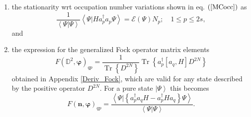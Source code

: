 \documentclass[aps,preprint]{revtex4}%
\begin{document}
\begin{enumerate}
\item the stationarity wrt occupation number variations shown in eq. $\left(
\ref{MCocc}\right)  $ as
\begin{equation}
\frac{1}{\left\langle \left.  \Psi\right\vert \Psi\right\rangle }\left\langle
\left.  \Psi\right\vert Ha_{p}^{\dagger}a_{p}\Psi\right\rangle =\mathcal{E}%
\left(  \Psi\right)  N_{p};\quad1\leq p\leq2s,
\end{equation}
and

\item the expression for the generalized Fock operator matrix elements
\cite{YellowBook}
\begin{equation}
F\left(  \mathbb{D}^{2},\bm{\varphi}\right)  _{qp}=\frac{1}{\operatorname{Tr}%
\left\{  D^{2N}\right\}  }\operatorname{Tr}\left\{  a_{p}^{\dagger}\left[
a_{q},H\right]  D^{2N}\right\}
\end{equation}
obtained in Appendix \ref{Deriv_Fock}, which are valid for any state described
by the positive operator $D^{2N}$. For a pure state $\left\vert \Psi
\right\rangle $ this becomes
\begin{equation}
F\left(  \bm{n},\bm{\varphi}\right)  _{qp}=\frac{\left\langle \left.
\Psi\right\vert \left\{  a_{p}^{\dagger}a_{q}H-a_{p}^{\dagger}Ha_{q}\right\}
\Psi\right\rangle }{\left\langle \left.  \Psi\right\vert \Psi\right\rangle }.
\end{equation}

\end{enumerate}
\end{document}
